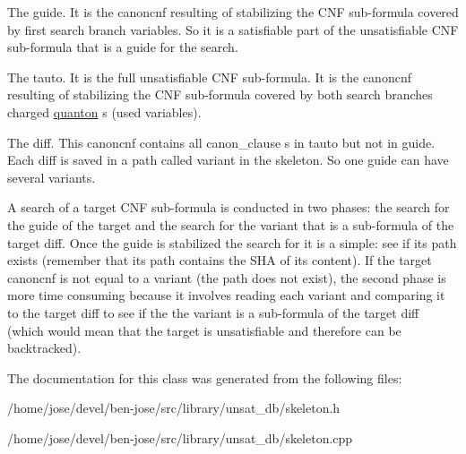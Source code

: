 \begin{DoxyItemize}
\item The guide. It is the canoncnf resulting of stabilizing the C\+NF sub-\/formula covered by first search branch variables. So it is a satisfiable part of the unsatisfiable C\+NF sub-\/formula that is a \textquotesingle{}\textquotesingle{}guide\textquotesingle{}\textquotesingle{} for the search.


\item The tauto. It is the full unsatisfiable C\+NF sub-\/formula. It is the canoncnf resulting of stabilizing the C\+NF sub-\/formula covered by both search branches charged \hyperlink{classquanton}{quanton} s (used variables).


\item The diff. This canoncnf contains all canon\+\_\+clause s in tauto but not in guide. Each diff is saved in a path called \textquotesingle{}variant\textquotesingle{} in the skeleton. So one guide can have several variants. 
\end{DoxyItemize}

A search of a target C\+NF sub-\/formula is conducted in two phases\+: the search for the guide of the target and the search for the variant that is a sub-\/formula of the target diff. Once the guide is stabilized the search for it is a simple\+: \textquotesingle{}\textquotesingle{}see if its path exists\textquotesingle{}\textquotesingle{} (remember that its path contains the S\+HA of its content). If the target canoncnf is not equal to a variant (the path does not exist), the second phase is more time consuming because it involves reading each variant and comparing it to the target diff to see if the the variant is a sub-\/formula of the target diff (which would mean that the target is unsatisfiable and therefore can be backtracked). 

The documentation for this class was generated from the following files\+:\begin{DoxyCompactItemize}
\item 
/home/jose/devel/ben-\/jose/src/library/unsat\+\_\+db/skeleton.\+h\item 
/home/jose/devel/ben-\/jose/src/library/unsat\+\_\+db/skeleton.\+cpp\end{DoxyCompactItemize}
